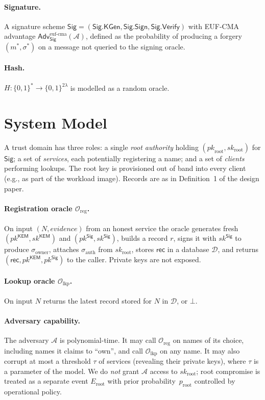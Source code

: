 \documentclass[11pt,a4paper]{article}
\theoremstyle{definition}
\theoremstyle{remark}
\newcommand{\rec}{\mathsf{rec}}
\newcommand{\KEM}{\mathsf{KEM}}
\newcommand{\Sig}{\mathsf{Sig}}
\newcommand{\Adv}{\mathsf{Adv}}
\newcommand{\KGen}{\mathsf{KGen}}
\newcommand{\Sign}{\mathsf{Sign}}
\newcommand{\Verify}{\mathsf{Verify}}
\newcommand{\pk}{\mathit{pk}}
\newcommand{\sk}{\mathit{sk}}
\newcommand{\bit}{\{0,1\}}
\begin{document}
\paragraph{Signature.} A signature scheme $\Sig = (\Sig.\KGen,
\Sig.\Sign, \Sig.\Verify)$ with EUF-CMA advantage
$\Adv^{\mathrm{euf\text{-}cma}}_{\Sig}(\mathcal{A})$, defined as the
probability of producing a forgery $(m^*, \sigma^*)$ on a message not
queried to the signing oracle.

\paragraph{Hash.} $H : \bit^* \to \bit^{2\lambda}$ is modelled as a
random oracle.

\section{System Model}

A trust domain has three roles: a single \emph{root authority} holding
$(\pk_{\mathrm{root}}, \sk_{\mathrm{root}})$ for $\Sig$; a set of
\emph{services}, each potentially registering a name; and a set of
\emph{clients} performing lookups. The root key is provisioned out of
band into every client (e.g., as part of the workload image). Records
are as in Definition~1 of the design paper.

\paragraph{Registration oracle $\mathcal{O}_{\mathrm{reg}}$.} On input
$(N, \mathit{evidence})$ from an honest service the oracle generates
fresh $(\pk^\KEM, \sk^\KEM)$ and $(\pk^\Sig, \sk^\Sig)$, builds a
record $r$, signs it with $\sk^\Sig$ to produce
$\sigma_{\mathrm{owner}}$, attaches $\sigma_{\mathrm{auth}}$ from
$\sk_{\mathrm{root}}$, stores $\rec$ in a database $\mathcal{D}$, and
returns $(\rec, \pk^\KEM, \pk^\Sig)$ to the caller. Private keys are
not exposed.

\paragraph{Lookup oracle $\mathcal{O}_{\mathrm{lkp}}$.} On input $N$
returns the latest record stored for $N$ in $\mathcal{D}$, or $\bot$.

\paragraph{Adversary capability.} The adversary $\mathcal{A}$ is
polynomial-time. It may call $\mathcal{O}_{\mathrm{reg}}$ on names of
its choice, including names it claims to ``own'', and call
$\mathcal{O}_{\mathrm{lkp}}$ on any name. It may also corrupt at most a
threshold $\tau$ of services (revealing their private keys), where
$\tau$ is a parameter of the model. We do \emph{not} grant
$\mathcal{A}$ access to $\sk_{\mathrm{root}}$; root compromise is
treated as a separate event $E_{\mathrm{root}}$ with prior
probability~$p_{\mathrm{root}}$ controlled by operational policy.
\end{document}
